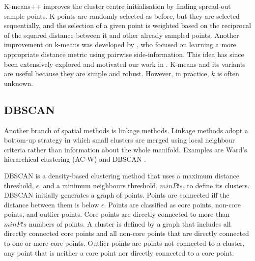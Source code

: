 \documentclass[../thesis.tex]{subfiles}
\begin{document}
K-means++ \cite{Arthur2007} improves the cluster centre initialisation by finding spread-out sample points. K points are randomly selected as before, but they are selected sequentially, and the selection of a given point is weighted based on the reciprocal of the squared distance between it and other already sampled points. Another improvement on k-means was developed by \citet{xing2002distance}, who focused on learning a more appropriate distance metric using pairwise side-information. This idea has since been extensively explored \cite{Ceccarelli2008,ailon2018approximate,choudhury2019top,kim2017relaxed,mazumdar2017clustering} and motivated our work in .
K-means and its variants are useful because they are simple and robust. However, in practice, $k$ is often unknown. 

\subsection{DBSCAN}
Another branch of spatial methods is linkage methods. Linkage methods adopt a bottom-up strategy in which small clusters are merged using local neighbour criteria rather than information about the whole manifold. Examples are Ward's hierarchical clustering (AC-W) \cite{Murtagh2014} and DBSCAN \cite{Sander1998}. 

DBSCAN is a density-based clustering method that uses a maximum distance threshold, $\epsilon$, and a minimum neighbours threshold, $minPts$, to define its clusters.
DBSCAN initially generates a graph of points. Points are connected iff the distance between them is below $\epsilon$. 
Points are classified as core points, non-core points, and outlier points. Core points are directly connected to more than $minPts$ numbers of points. A cluster is defined by a graph that includes all directly connected core points and all non-core points that are directly connected to one or more core points. Outlier points are points not connected to a cluster, \ie any point that is neither a core point nor directly connected to a core point.

    









    
\end{document}
